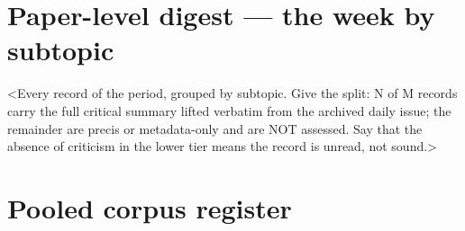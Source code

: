 \documentclass[10pt]{article}
\begin{document}
\clearpage

\section*{\sffamily\bfseries\color{Deep}Paper-level digest --- the week by subtopic}
\vspace{-1.5mm}{\color{Teal}\rule{\linewidth}{1.1pt}}\vspace{2mm}

\footnotesize
<Every record of the period, grouped by subtopic. Give the split: N of M records carry the
full critical summary lifted verbatim from the archived daily issue; the remainder are
precis or metadata-only and are NOT assessed. Say that the absence of criticism in the
lower tier means the record is unread, not sound.>

\vspace{3mm}



\clearpage

\section*{\sffamily\bfseries\color{Deep}Pooled corpus register}
\vspace{-1.5mm}{\color{Teal}\rule{\linewidth}{1.1pt}}\vspace{2.5mm}


\end{document}
